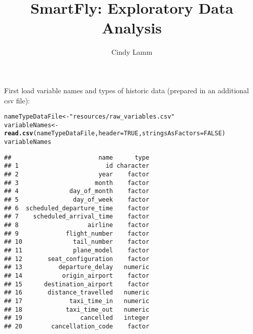 \documentclass{article}\usepackage[]{graphicx}\usepackage[]{color}
\makeatletter
\newcommand{\hlnum}[1]{\textcolor[rgb]{0.686,0.059,0.569}{#1}}%
\newcommand{\hlstr}[1]{\textcolor[rgb]{0.192,0.494,0.8}{#1}}%
\newcommand{\hlstd}[1]{\textcolor[rgb]{0.345,0.345,0.345}{#1}}%
\newcommand{\hlkwb}[1]{\textcolor[rgb]{0.69,0.353,0.396}{#1}}%
\newcommand{\hlkwc}[1]{\textcolor[rgb]{0.333,0.667,0.333}{#1}}%
\newcommand{\hlkwd}[1]{\textcolor[rgb]{0.737,0.353,0.396}{\textbf{#1}}}%
\newenvironment{kframe}{%
 \def\at@end@of@kframe{}%
 \ifinner\ifhmode%
  \def\at@end@of@kframe{\end{minipage}}%
  \begin{minipage}{\columnwidth}%
 \fi\fi%
 \def\FrameCommand##1{\hskip\@totalleftmargin \hskip-\fboxsep
 \colorbox{shadecolor}{##1}\hskip-\fboxsep
     \hskip-\linewidth \hskip-\@totalleftmargin \hskip\columnwidth}%
 \MakeFramed {\advance\hsize-\width
   \@totalleftmargin\z@ \linewidth\hsize
   \@setminipage}}%
 {\par\unskip\endMakeFramed%
 \at@end@of@kframe}
\newenvironment{knitrout}{}{} %
\makeatother
\begin{document}
\title{SmartFly: Exploratory Data Analysis}


\author{Cindy Lamm}

\maketitle
First load variable names and types of historic data (prepared in an additional csv file):


\begin{knitrout}
\color{fgcolor}\begin{kframe}
\begin{alltt}
\hlstd{nameTypeDataFile}  \hlkwb{<-} \hlstr{"resources/raw_variables.csv"}
\hlstd{variableNames} \hlkwb{<-} \hlkwd{read.csv}\hlstd{(nameTypeDataFile,} \hlkwc{header}\hlstd{=}\hlnum{TRUE}\hlstd{,} \hlkwc{stringsAsFactors}\hlstd{=}\hlnum{FALSE}\hlstd{)}
\hlstd{variableNames}
\end{alltt}
\begin{verbatim}
##                        name      type
## 1                        id character
## 2                      year    factor
## 3                     month    factor
## 4              day_of_month    factor
## 5               day_of_week    factor
## 6  scheduled_departure_time    factor
## 7    scheduled_arrival_time    factor
## 8                   airline    factor
## 9             flight_number    factor
## 10              tail_number    factor
## 11              plane_model    factor
## 12       seat_configuration    factor
## 13          departure_delay   numeric
## 14           origin_airport    factor
## 15      destination_airport    factor
## 16       distance_travelled   numeric
## 17             taxi_time_in   numeric
## 18            taxi_time_out   numeric
## 19                cancelled   integer
## 20        cancellation_code    factor
\end{verbatim}
\end{kframe}
\end{knitrout}
\end{document}
